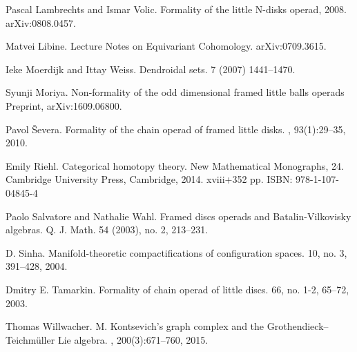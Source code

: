 \documentclass[a4paper]{amsart}
\theoremstyle{plain}
\theoremstyle{definition}
\begin{document}
\begin{thebibliography}{1}
Pascal Lambrechts and Ismar Volic.
\newblock Formality of the little {N}-disks operad, 2008.
\newblock arXiv:0808.0457.

Matvei Libine.
\newblock Lecture Notes on Equivariant Cohomology.
\newblock arXiv:0709.3615.

Ieke Moerdijk and Ittay Weiss.
\newblock Dendroidal sets.
 7 (2007) 1441--1470.

Syunji Moriya.
\newblock Non-formality of the odd dimensional framed little balls operads
\newblock Preprint, arXiv:1609.06800.


Pavol {\v{S}}evera.
\newblock Formality of the chain operad of framed little disks.
, 93(1):29--35, 2010.

Emily Riehl.
\newblock Categorical homotopy theory.
\newblock New Mathematical Monographs, 24. Cambridge University Press, Cambridge, 2014. xviii+352 pp. ISBN: 978-1-107-04845-4

Paolo Salvatore and Nathalie Wahl.
\newblock Framed discs operads and Batalin-Vilkovisky algebras.
\newblock Q. J. Math. 54 (2003), no. 2, 213--231. 

D. Sinha.
\newblock Manifold-theoretic compactifications of configuration spaces.
 10, no. 3, 391--428, 2004.

Dmitry E. Tamarkin.
\newblock Formality of chain operad of little discs.
 66, no. 1-2, 65--72, 2003.

Thomas Willwacher.
\newblock M. {K}ontsevich's graph complex and the
  {G}rothendieck--{T}eichm\"uller {L}ie algebra.
, 200(3):671--760, 2015.

\end{thebibliography}
\end{document}
